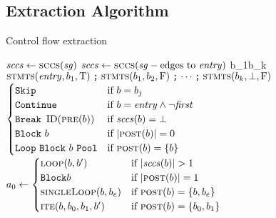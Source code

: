 \subsection{Extraction Algorithm}
\begin{algorithm}
  \caption{Control flow extraction}\label{algo:cf}
  \begin{algorithmic}
      \State $\var{sccs}\gets\Call{sccs}{\var{sg}}$
        \label{line:scc1}
        \State $\var{sccs}\gets\Call{sccs}{\var{sg}-\text{edges to }\var{entry}}$
        \label{line:scc2}
      \EndIf
      \State {}
      {\ll b_1\ll\dotsb\ll b_k\ll\bot}%
      \label{line:ipdoms}
      \State\Return $\Call{stmts}{\var{entry},b_1,\true}\ASeq
      \Call{stmts}{b_1,b_2,\false}\ASeq\dotsb\ASeq
      \Call{stmts}{b_k,\bot,\false}$
    \EndFunction
      \State\Return $\begin{cases}
        \ASkip & \text{if }b=b_j \\
        \AContinue & \text{if }b=\var{entry}\wedge\neg\var{first} \\
        \ABreak~\ID(\Call{pre}{b}) & \text{if }\var{sccs}(b)=\bot \\
        \ABB~b & \text{if }\abs{\Call{post}{b}}=0 \\
        \AWhile~\ABB~b~\AOd & \text{if }\Call{post}{b}=\{b\}
      \end{cases}$\label{line:prepost}
      \State {}
      \State $a_0\gets\begin{cases}
        \Call{loop}{b,b'} & \text{if }\abs{\var{sccs}(b)}>1 \\
        \ABB b & \text{if }\abs{\Call{post}{b}}=1 \\
        \Call{singleLoop}{b,b_e} & \text{if }\Call{post}{b}=\{b,b_e\} \\
        \Call{ite}{b,b_0,b_1,b'} & \text{if }\Call{post}{b}=\{b_0,b_1\}
      \end{cases}$\label{line:post}

\end{algorithmic}
\end{algorithm}
